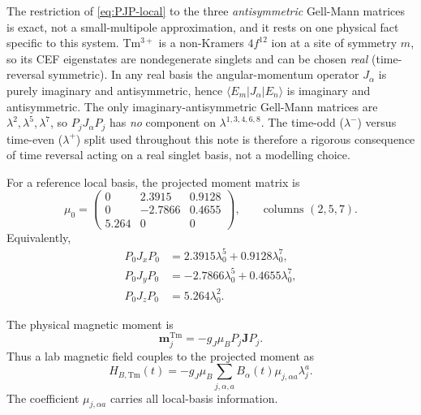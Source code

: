 \documentclass[11pt,a4paper]{article}
\newcommand{\Tm}{\mathrm{Tm}}
\newcommand{\ket}[1]{|#1\rangle}
\newcommand{\bra}[1]{\langle #1|}
\newcommand{\ve}[1]{\boldsymbol{#1}}
\begin{document}
\begin{keybox}[title={Lemma: why only $\lambda^2,\lambda^5,\lambda^7$ appear}]
The restriction of \eqref{eq:PJP-local} to the three \emph{antisymmetric}
Gell-Mann matrices is exact, not a small-multipole approximation, and it rests
on one physical fact specific to this system.  Tm$^{3+}$ is a non-Kramers
$4f^{12}$ ion at a site of symmetry $m$, so its CEF eigenstates are
nondegenerate singlets and can be chosen \emph{real} (time-reversal symmetric).
In any real basis the angular-momentum operator $J_\alpha$ is purely imaginary
and antisymmetric, hence $\bra{E_m}J_\alpha\ket{E_n}$ is imaginary and
antisymmetric.  The only imaginary-antisymmetric Gell-Mann matrices are
$\lambda^2,\lambda^5,\lambda^7$, so $P_jJ_\alpha P_j$ has \emph{no} component
on $\lambda^{1,3,4,6,8}$.  The time-odd ($\lambda^-$) versus time-even
($\lambda^+$) split used throughout this note is therefore a rigorous
consequence of time reversal acting on a real singlet basis, not a modelling
choice.
\end{keybox}

For a reference local basis, the projected moment matrix is
\begin{equation}
  \mu_0=
  \begin{pmatrix}
    0&2.3915&0.9128\\
    0&-2.7866&0.4655\\
    5.264&0&0
  \end{pmatrix},
  \qquad
  \text{columns }(2,5,7).
  \label{eq:mu0}
\end{equation}
Equivalently,
\begin{align}
  P_0J_xP_0 &=2.3915\lambda_0^5+0.9128\lambda_0^7,\\
  P_0J_yP_0 &=-2.7866\lambda_0^5+0.4655\lambda_0^7,\\
  P_0J_zP_0 &=5.264\lambda_0^2.
\end{align}

The physical magnetic moment is
\begin{equation}
  \ve m_j^{\Tm}=-g_J\mu_B P_j\ve J P_j.
\end{equation}
Thus a lab magnetic field couples to the projected moment as
\begin{equation}
  H_{B,\Tm}(t)
  =-g_J\mu_B\sum_{j,\alpha,a}B_\alpha(t)\mu_{j,\alpha a}\lambda_j^a.
\end{equation}
The coefficient $\mu_{j,\alpha a}$ carries all local-basis information.

\end{document}
